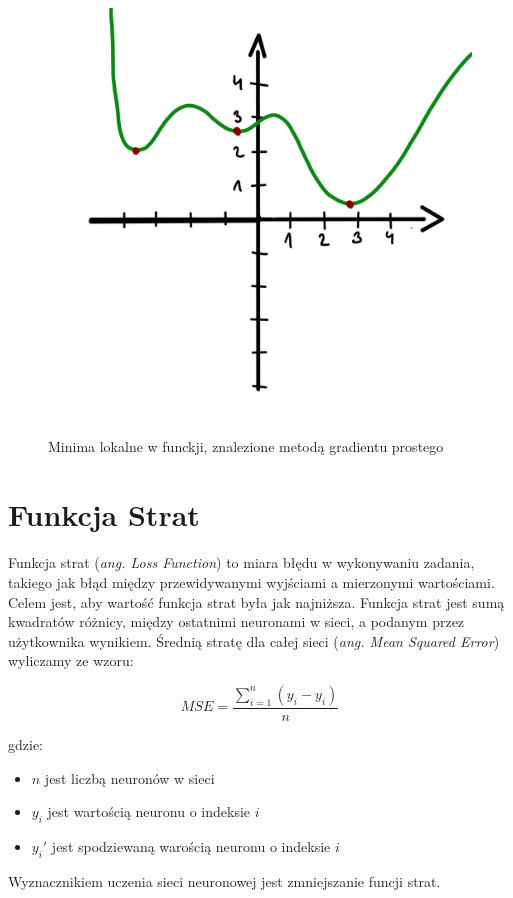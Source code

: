 \documentclass[openright]{xmgr}
\begin{document}
\begin{figure}[!tbh]
\centering
\includegraphics[width=.8\hsize]{fig/11}
\caption{Minima lokalne w funckji, znalezione metodą gradientu prostego\label{RYS.3}}
\end{figure}

 \section{Funkcja Strat \label{s:dsssl}}
 
\indent \indent Funkcja strat (\textit{ang. Loss Function}) to miara błędu w wykonywaniu zadania, takiego jak błąd między przewidywanymi wyjściami a mierzonymi wartościami. Celem jest, aby wartość funkcja strat była jak najniższa. 
Funkcja strat jest sumą kwadratów różnicy, między ostatnimi neuronami w sieci, a podanym przez użytkownika wynikiem. Średnią stratę dla całej sieci (\textit{ang. Mean Squared Error}) wyliczamy ze wzoru:  

$$MSE=\frac{\sum_{i=1}^{n} (y_i - y_i)}{n}$$

gdzie: 

\begin{itemize}
\item $n$ jest liczbą neuronów w sieci
\item $y_i$ jest wartością neuronu o indeksie $i$ 
\item $y_i'$ jest spodziewaną warością neuronu o indeksie $i$ 
\end{itemize}

Wyznacznikiem uczenia sieci neuronowej jest zmniejszanie funcji strat. 
\end{document}
